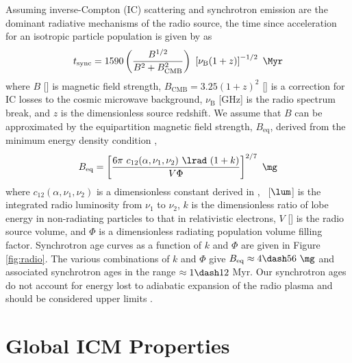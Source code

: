 \documentclass[useAMS,usenatbib]{mn2e}
\begin{document}
Assuming inverse-Compton (IC) scattering and synchrotron emission are
the dominant radiative mechanisms of the radio source, the time since
acceleration for an isotropic particle population is given by
\citet{2001AJ....122.1172S} as
\begin{equation}
  \tsync = 1590 \left(\frac{B^{1/2}}{B^2 + B_{\mathrm{CMB}}^2}\right)~
  \left[\nu_{\mathrm{B}} (1+z)\right]^{-1/2} ~\Myr
\end{equation}
where $B$ [\mg] is magnetic field strength, $B_{\mathrm{CMB}} =
3.25(1+z)^2$ [\mg] is a correction for IC losses to the cosmic
microwave background, $\nu_{\mathrm{B}}$ [GHz] is the radio spectrum
break, and $z$ is the dimensionless source redshift. We assume that
$B$ can be approximated by the equipartition magnetic field strength,
$B_{\mathrm{eq}}$, derived from the minimum energy density condition
\citep{1980ARA&A..18..165M},
\begin{equation}
  B_{\mathrm{eq}} = \left[\frac{6 \pi ~c_{12}(\alpha,\nu_1, \nu_2)
      ~\lrad ~(1+k)}{V \Phi}\right]^{2/7} ~\mathrm{\mg}
\end{equation}
where $c_{12}(\alpha,\nu_1,\nu_2)$ is a dimensionless constant derived
in \citet{pach}, \lrad\ [$\lum$] is the integrated radio luminosity
from $\nu_1$ to $\nu_2$, $k$ is the dimensionless ratio of lobe energy
in non-radiating particles to that in relativistic electrons, $V$
[\cc] is the radio source volume, and $\Phi$ is a dimensionless
radiating population volume filling factor. Synchrotron age curves as
a function of $k$ and $\Phi$ are given in Figure \ref{fig:radio}. The
various combinations of $k$ and $\Phi$ give $B_{\mathrm{eq}} \approx 4
\dash 56 ~\mg$ and associated synchrotron ages in the range $\approx 1
\dash 12$ Myr. Our synchrotron ages do not account for energy lost to
adiabatic expansion of the radio plasma and should be considered upper
limits \citep{1968ARA&A...6..321S}.

\section{Global ICM Properties}
\label{sec:global}
\end{document}

